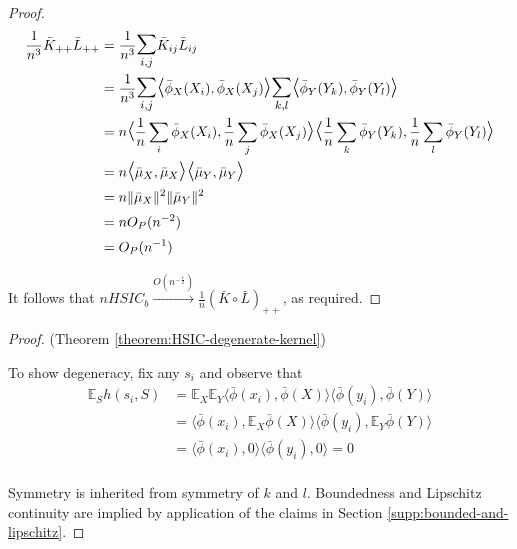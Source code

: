 \documentclass[]{article}
\begin{document}
\begin{proof}
\begin{align*}
 \frac{1}{n^3}\bar{K}_{++}\bar{L}_{++} &= \frac{1}{n^3}\mathlarger{\mathlarger{\sum}}_{i,j}\bar{K}_{ij}\bar{L}_{ij}\\
 & =  \frac{1}{n^3}\mathlarger{\mathlarger{\sum}}_{i,j}\mathlarger{\mathlarger{\langle}} \bar{\phi}_X(X_i), \bar{\phi}_X(X_j) \mathlarger{\mathlarger{\rangle}} \mathlarger{\mathlarger{\sum}}_{k,l}\mathlarger{\mathlarger{\langle}} \bar{\phi}_Y(Y_k), \bar{\phi}_Y(Y_l) \mathlarger{\mathlarger{\rangle}} \\ &
 = n\mathlarger{\mathlarger{\langle}} \frac{1}{n}\sum_i\bar{\phi}_X(X_i) , \frac{1}{n}\sum_j\bar{\phi}_X(X_j) \mathlarger{\mathlarger{\rangle}} \mathlarger{\mathlarger{\langle}} \frac{1}{n}\sum_k\bar{\phi}_Y(Y_k)  , \frac{1}{n}\sum_l\bar{\phi}_Y(Y_l) \mathlarger{\mathlarger{\rangle}}\\&
 = n \mathlarger{\mathlarger{\langle}} \bar{\mu}_X , \bar{\mu}_X \mathlarger{\mathlarger{\rangle}} \mathlarger{\mathlarger{\langle}} \bar{\mu}_Y , \bar{\mu}_Y  \mathlarger{\mathlarger{\rangle}} \\ &
= n\|\bar{\mu}_X \|^2 \|\bar{\mu}_Y \|^2\\ &= nO_P(n^{-2}) \\&= O_P(n^{-1})
\end{align*}


It follows that $nHSIC_b  \xrightarrow{O(n^{-\frac{1}{2}})} \frac{1}{n} (\bar{K}\circ \bar{L})_{++}$, as required.
\end{proof}

\begin{proof}(Theorem \ref{theorem:HSIC-degenerate-kernel})

To show degeneracy, fix any $s_i$ and observe that 
\begin{align*}
\mathbb{E}_{S}h(s_i,S) &= \mathbb{E}_X\mathbb{E}_Y \langle\bar{\phi}(x_i),\bar{\phi}(X)\rangle \langle\bar{\phi}(y_i),\bar{\phi}(Y)\rangle \\
&= \langle\bar{\phi}(x_i),\mathbb{E}_X\bar{\phi}(X)\rangle \langle\bar{\phi}(y_i),\mathbb{E}_Y\bar{\phi}(Y)\rangle \\
&= \langle\bar{\phi}(x_i),0\rangle \langle\bar{\phi}(y_i),0\rangle = 0\\
\end{align*}	

Symmetry is inherited from symmetry of $k$ and $l$. Boundedness and Lipschitz continuity are implied by application of the claims in Section \ref{supp:bounded-and-lipschitz}.

\end{proof}
\end{document}
